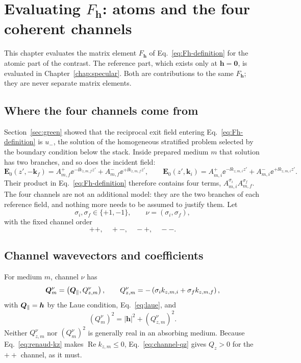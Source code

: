 \chapter{Evaluating \texorpdfstring{$F_{\bm h}$}{Fh}: atoms and the four coherent channels}
\label{chap:unit-cells}

This chapter evaluates the matrix element $F_{\bm h}$ of
Eq.~\eqref{eq:Fh-definition} for the atomic part of the contrast.  The
reference part, which exists only at $\bm h=\bm0$, is evaluated in
Chapter~\ref{chap:specular}.  Both are contributions to the same
$F_{\bm h}$; they are never separate matrix elements.

\section{Where the four channels come from}

Section~\ref{sec:green} showed that the reciprocal exit field entering
Eq.~\eqref{eq:Fh-definition} is $u_-$, the solution of the homogeneous
stratified problem selected by the boundary condition below the stack.  Inside
prepared medium $m$ that solution has two branches, and so does the incident
field:
\begin{equation}
  \bm E_0(z',-\bm k_f)
  =A_{m,f}^{+}\ee^{-\ii k_{z,m,f}z'}+A_{m,f}^{-}\ee^{+\ii k_{z,m,f}z'},
  \qquad
  \bm E_0(z',\bm k_i)
  =A_{m,i}^{+}\ee^{-\ii k_{z,m,i}z'}+A_{m,i}^{-}\ee^{+\ii k_{z,m,i}z'}.
  \label{eq:two-branches}
\end{equation}
Their product in Eq.~\eqref{eq:Fh-definition} therefore contains four terms,
$A_{m,i}^{\sigma_i}A_{m,f}^{\sigma_f}$.  The four channels are not an
additional model: they are the two branches of each reference field, and
nothing more needs to be assumed to justify them.  Let
\begin{equation}
  \sigma_i,\sigma_f\in\{+1,-1\},
  \qquad
  \nu=(\sigma_i,\sigma_f),
\end{equation}
with the fixed channel order
\begin{equation}
  ++,\quad +-,\quad -+,\quad --.
  \label{eq:channel-order}
\end{equation}

\section{Channel wavevectors and coefficients}

For medium $m$, channel $\nu$ has
\begin{equation}
  \bm Q_{m}^{\nu}
  =\left(\bm{Q}_{\parallel},Q_{z,m}^{\nu}\right),
  \qquad
  Q_{z,m}^{\nu}
  =-\left(\sigma_i k_{z,m,i}+\sigma_f k_{z,m,f}\right),
  \label{eq:channel-qz}
\end{equation}
with $\bm{Q}_{\parallel}=\bm h$ by the Laue condition, Eq.~\eqref{eq:laue}, and
\begin{equation}
  \left(Q_m^\nu\right)^2
  =|\bm h|^2+\left(Q_{z,m}^{\nu}\right)^2.
  \label{eq:channel-q2}
\end{equation}
Neither $Q_{z,m}^{\nu}$ nor $(Q_m^\nu)^2$ is generally real in an absorbing
medium.  Because Eq.~\eqref{eq:renaud-kz} makes $\operatorname{Re}k_{z,m}\le0$,
Eq.~\eqref{eq:channel-qz} gives $Q_z>0$ for the $++$ channel, as it must.


